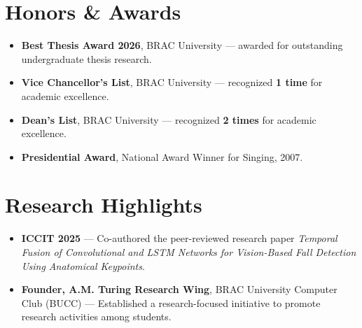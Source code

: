 \section{Honors \& Awards}

\begin{itemize}

    \item \textbf{Best Thesis Award 2026}, BRAC University — awarded for outstanding undergraduate thesis research.

    \item \textbf{Vice Chancellor's List}, BRAC University — recognized \textbf{1 time} for academic excellence.

    \item \textbf{Dean's List}, BRAC University — recognized \textbf{2 times} for academic excellence.

    \item \textbf{Presidential Award}, National Award Winner for Singing, 2007.

\end{itemize}

\section{Research Highlights}

\begin{itemize}

    \item \textbf{ICCIT 2025} — Co-authored the peer-reviewed research paper \textit{Temporal Fusion of Convolutional and LSTM Networks for Vision-Based Fall Detection Using Anatomical Keypoints}.

    \item \textbf{Founder, A.M. Turing Research Wing}, BRAC University Computer Club (BUCC) — Established a research-focused initiative to promote research activities among students.

\end{itemize}

\endinput